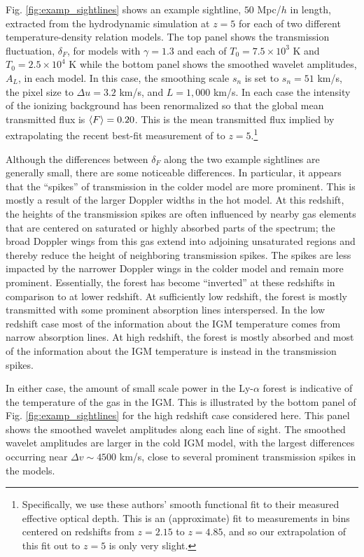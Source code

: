 Fig. \ref{fig:examp_sightlines} shows an example sightline, $50$ Mpc/$h$ in length, extracted from the hydrodynamic simulation at $z=5$
for each of two different temperature-density relation models. The top panel shows the transmission fluctuation, $\delta_F$, for
models with $\gamma=1.3$ and each of $T_0 = 7.5 \times 10^3$ K and $T_0 = 2.5 \times 10^4$ K while the bottom panel shows the
smoothed wavelet amplitudes, $A_L$, in each model. In this case, the smoothing scale $s_n$ is set to $s_n=51$ km/s, the pixel
size to $\Delta u = 3.2$ km/s, and $L=1,000$ km/s. 
In each case the intensity of the ionizing background has been renormalized
so that the global mean transmitted flux is $\langle F \rangle=0.20$. This is the mean transmitted flux implied by extrapolating 
the recent best-fit measurement of \citet{Becker:2012aq} to $z=5$.\footnote{Specifically, we use these authors' smooth functional fit to their measured effective optical
depth. This is an (approximate) fit to measurements in bins centered on redshifts from $z=2.15$ to $z=4.85$, and so our extrapolation of
this fit out to $z=5$ is only very slight.}

Although the differences between $\delta_F$ along the
two example sightlines are generally small, there are some noticeable differences. 
In particular, it appears that the ``spikes'' of
transmission in the colder model are more prominent. This is mostly a result of the larger Doppler widths in the hot model. 
At this redshift, the heights of the transmission spikes are often influenced
by nearby gas elements that are centered on
saturated or highly absorbed parts of the spectrum; the broad Doppler wings from this gas extend into 
adjoining unsaturated regions and thereby reduce the
height of neighboring transmission spikes. The spikes are
less impacted by the narrower Doppler wings in the colder model and remain more prominent.
Essentially, the forest has become
``inverted'' at these redshifts in comparison to at lower redshift. At sufficiently low redshift, the forest is mostly transmitted
with some prominent absorption lines interspersed. In the low redshift case most of the information about the IGM temperature comes from
narrow absorption lines. At high redshift, the forest is mostly absorbed and most of the information about the IGM temperature
is instead in the transmission spikes. 

In either case, the amount of small scale power in the Ly-$\alpha$ forest is indicative
of the temperature of the gas in the IGM. This is illustrated by the bottom panel of Fig. \ref{fig:examp_sightlines} for
the high redshift case considered here. This panel
shows the smoothed wavelet amplitudes along each line of sight. The smoothed wavelet amplitudes are larger in the cold IGM model,
with the largest differences occurring near $\Delta v \sim 4500$ km/s, close to several prominent transmission spikes in the models.

